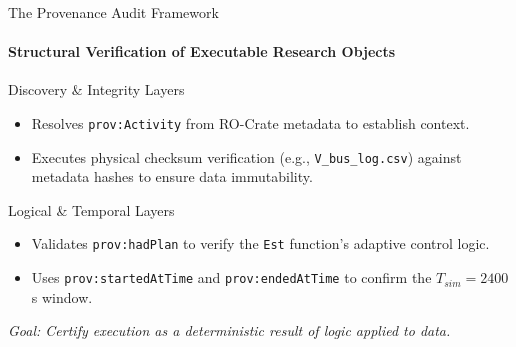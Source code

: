 \documentclass[aspectratio=169]{beamer}
\begin{document}
\begin{frame}{The Provenance Audit Framework}
    \framesubtitle{Structural Verification of Executable Research Objects}
    
    \begin{block}{Discovery \& Integrity Layers}
        \begin{itemize}
            \item Resolves \texttt{prov:Activity} from RO-Crate metadata to establish context.
            \item Executes physical checksum verification (e.g., \texttt{V\_bus\_log.csv}) against metadata hashes to ensure data immutability.
        \end{itemize}
    \end{block}

    \begin{block}{Logical \& Temporal Layers}
        \begin{itemize}
            \item Validates \texttt{prov:hadPlan} to verify the \texttt{Est} function’s adaptive control logic.
            \item Uses \texttt{prov:startedAtTime} and \texttt{prov:endedAtTime} to confirm the $T_{sim} = 2400$s window.
        \end{itemize}
    \end{block}

    \vfill
    \centering
    \textit{Goal: Certify execution as a deterministic result of logic applied to data.}
\end{frame}
\end{document}
